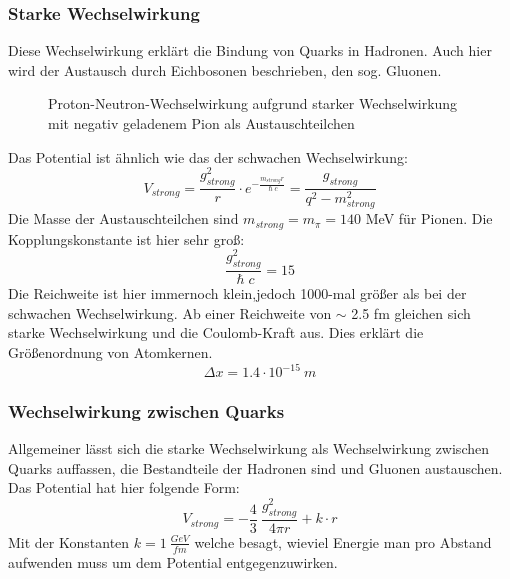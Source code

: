 \documentclass[Ex4_Zusammenfassung.tex]{subfiles}
\begin{document}
\subsubsection{Starke Wechselwirkung}
Diese Wechselwirkung erklärt die Bindung von Quarks in Hadronen. Auch hier wird der Austausch durch Eichbosonen beschrieben, den sog. Gluonen. 
\begin{figure}[H]
\centering
{}
					\caption{Proton-Neutron-Wechselwirkung aufgrund starker Wechselwirkung mit negativ geladenem Pion als Austauschteilchen}
\end{figure}
Das Potential ist ähnlich wie das der schwachen Wechselwirkung:
\begin{equation}
V_{strong} = \frac{g_{strong}^2}{r} \cdot e^{-\frac{m_{strong} r}{\hslash c}} = \frac{g_{strong}}{q^2 - m_{strong}^2}
\end{equation}
Die Masse der Austauschteilchen sind  $ m_{strong} = m_{\pi} = 140 $ MeV für Pionen. \newline
Die Kopplungskonstante ist hier sehr groß:
\begin{equation}
\frac{g_{strong}^2}{\hslash c } = 15 
\end{equation}
Die Reichweite ist hier immernoch klein,jedoch 1000-mal größer als bei der schwachen Wechselwirkung. Ab einer Reichweite von $ \sim $ 2.5 fm gleichen sich starke Wechselwirkung und die Coulomb-Kraft aus. Dies erklärt die Größenordnung von Atomkernen. 
\begin{equation}
\Delta x = 1.4 \cdot 10^{-15} \ m 
\end{equation}

\subsubsection{Wechselwirkung zwischen Quarks}
Allgemeiner lässt sich die starke Wechselwirkung als Wechselwirkung zwischen Quarks auffassen, die Bestandteile der Hadronen sind und Gluonen austauschen. Das Potential hat hier folgende Form: 
\begin{equation}
V_{strong} = - \frac{4}{3} \  \frac{g_{strong}^2}{4 \pi r} + k \cdot r 
\end{equation}
Mit der Konstanten $ k = 1 \  \frac{GeV}{fm} $ welche besagt, wieviel Energie man pro Abstand aufwenden muss um dem Potential entgegenzuwirken. 
\end{document}
